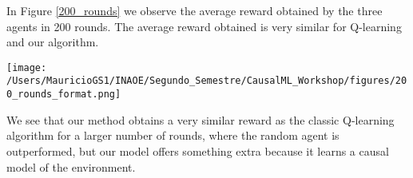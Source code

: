 \documentclass[a0,portrait]{a0poster}
\begin{document}
\begin{multicols}{3}
In Figure \ref{200_rounds} we observe the average reward obtained by the three agents in 200 rounds. The average reward obtained is very similar for Q-learning and our algorithm.

\begin{center}
\centerline{\texttt{[image: /Users/MauricioGS1/INAOE/Segundo\_Semestre/CausalML\_Workshop/figures/200\_rounds\_format.png]}}
\label{200_rounds}
\end{center}


We see that our method obtains a very similar reward as the classic Q-learning algorithm for a larger number of rounds, where the random agent is outperformed, but our model offers something extra because it learns a causal model of the environment. 


\end{multicols}
 
\end{document}
